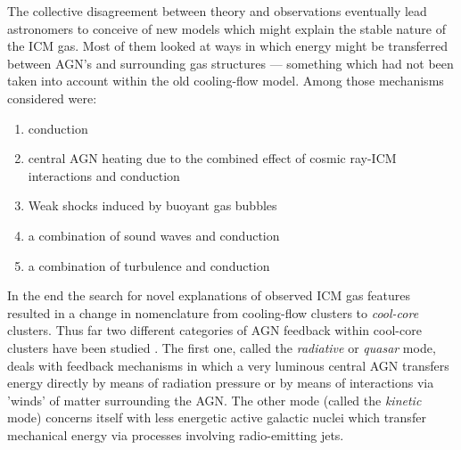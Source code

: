 \documentclass[twoside,single]{lion-msc}
\begin{document}
    The collective disagreement between theory and observations eventually lead astronomers to conceive of new models which might explain the stable nature of the ICM gas. Most of them looked at ways in which energy might be transferred between AGN's and surrounding gas structures --- something which had not been taken into account within the old cooling-flow model. Among those mechanisms considered were:

    \begin{enumerate}
            \item conduction \citep{Zakamska2003}
            \item central AGN heating due to the combined effect of cosmic ray-ICM interactions and conduction \citep{Guo2008}
            \item Weak shocks induced by buoyant gas bubbles \citep{Mathews2005}
            \item a combination of sound waves and conduction\citep{Ruszkowski2003}
            \item a combination of turbulence and conduction\citep{Dennis2006}
        \end{enumerate}
    
    In the end the search for novel explanations of observed ICM gas features resulted in a change in nomenclature from cooling-flow clusters to \textit{cool-core} clusters. Thus far two different categories of AGN feedback within cool-core clusters have been studied \citep{Fabian2012}. The first one, called the \textit{radiative} or \textit{quasar} mode, deals with feedback mechanisms in which a very luminous central AGN transfers energy directly by means of radiation pressure or by means of interactions via 'winds' of matter surrounding the AGN. The other mode (called the \textit{kinetic} mode) concerns itself with less energetic active galactic nuclei which transfer mechanical energy via processes involving radio-emitting jets. \\ 
    
\end{document}
